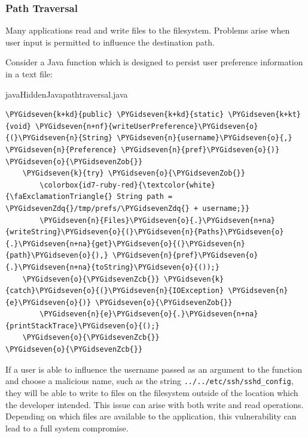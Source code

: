 \documentclass[a4paper,openany,12pt]{book}
\begin{document}
\subsubsection{Path Traversal}

Many applications read and write files to the filesystem.
Problems arise when user input is permitted to influence the destination path.

Consider a Java function which is designed to persist user preference information in a text file:

\newsavebox\myvb
\begin{lrbox}{\myvb}\begin{minipage}{\textwidth}
\begin{mycodefile}{java}{Hidden}{Java}{pathtraversal.java}\end{mycodefile}
\end{minipage}\end{lrbox}

\begin{mdframed}
\begin{Verbatim}[commandchars=\\\{\}]
\PYGidseven{k+kd}{public} \PYGidseven{k+kd}{static} \PYGidseven{k+kt}{void} \PYGidseven{n+nf}{writeUserPreference}\PYGidseven{o}{(}\PYGidseven{n}{String} \PYGidseven{n}{username}\PYGidseven{o}{,} \PYGidseven{n}{Preference} \PYGidseven{n}{pref}\PYGidseven{o}{)} \PYGidseven{o}{\PYGidsevenZob{}}
    \PYGidseven{k}{try} \PYGidseven{o}{\PYGidsevenZob{}}
        \colorbox{id7-ruby-red}{\textcolor{white}{\faExclamationTriangle{} String path = \PYGidsevenZdq{}/tmp/prefs/\PYGidsevenZdq{} + username;}}
        \PYGidseven{n}{Files}\PYGidseven{o}{.}\PYGidseven{n+na}{writeString}\PYGidseven{o}{(}\PYGidseven{n}{Paths}\PYGidseven{o}{.}\PYGidseven{n+na}{get}\PYGidseven{o}{(}\PYGidseven{n}{path}\PYGidseven{o}{),} \PYGidseven{n}{pref}\PYGidseven{o}{.}\PYGidseven{n+na}{toString}\PYGidseven{o}{());}
    \PYGidseven{o}{\PYGidsevenZcb{}} \PYGidseven{k}{catch}\PYGidseven{o}{(}\PYGidseven{n}{IOException} \PYGidseven{n}{e}\PYGidseven{o}{)} \PYGidseven{o}{\PYGidsevenZob{}}
        \PYGidseven{n}{e}\PYGidseven{o}{.}\PYGidseven{n+na}{printStackTrace}\PYGidseven{o}{();}
    \PYGidseven{o}{\PYGidsevenZcb{}}
\PYGidseven{o}{\PYGidsevenZcb{}}
\end{Verbatim}
\end{mdframed}

If a user is able to influence the username passed as an argument to the function and choose a malicious name, such as
the string \texttt{../../etc/ssh/sshd_config}, they will be able to write to files on the filesystem outside of the
location which the developer intended.
This issue can arise with both write and read operations.
Depending on which files are available to the application, this vulnerability can lead to a full system compromise.
\end{document}
